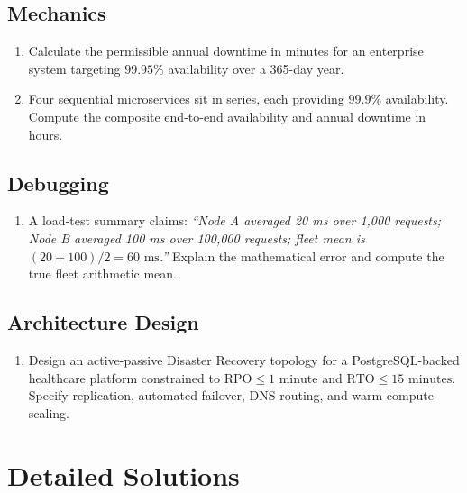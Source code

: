\subsection*{Mechanics}
\begin{enumerate}[label=\textbf{Exercise~\thechapter.\arabic*}, leftmargin=*]
  \item Calculate the permissible annual downtime in minutes for an enterprise system targeting $99.95\%$ availability over a 365-day year.
  \item Four sequential microservices sit in series, each providing $99.9\%$ availability. Compute the composite end-to-end availability and annual downtime in hours.
\end{enumerate}

\subsection*{Debugging}
\begin{enumerate}[label=\textbf{Exercise~\thechapter.\arabic*}, leftmargin=*, start=3]
  \item A load-test summary claims: \textit{``Node A averaged 20 ms over 1,000 requests; Node B averaged 100 ms over 100,000 requests; fleet mean is $(20+100)/2 = 60\text{ ms}$.''} Explain the mathematical error and compute the true fleet arithmetic mean.
\end{enumerate}

\subsection*{Architecture Design}
\begin{enumerate}[label=\textbf{Exercise~\thechapter.\arabic*}, leftmargin=*, start=4]
  \item Design an active-passive Disaster Recovery topology for a PostgreSQL-backed healthcare platform constrained to $\text{RPO} \le 1\text{ minute}$ and $\text{RTO} \le 15\text{ minutes}$. Specify replication, automated failover, DNS routing, and warm compute scaling.
\end{enumerate}

\section{Detailed Solutions}

